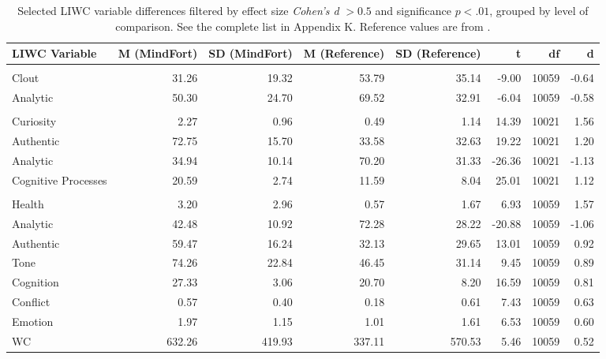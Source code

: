 \documentclass[sigconf]{acmart}
\begin{document}
\begin{table}[t]
\centering
\footnotesize
\caption{Selected LIWC variable differences filtered by effect size \textit{Cohen’s d} $> 0.5$ and significance $p < .01$, grouped by level of comparison. See the complete list in Appendix K. Reference values are from \cite{lmsys-chat-1m}.}
\label{tab:liwc_results_selected}
\begin{tabular}{lrrrrrrr}
\toprule
\textbf{LIWC Variable} & \textbf{M (MindFort)} & \textbf{SD (MindFort)} & \textbf{M (Reference)} & \textbf{SD (Reference)} & \textbf{t} & $\textbf{df}$ & \textbf{d} \\
\midrule
\addlinespace
\multicolumn{8}{l}{\textbf{Human messages only}} \\

Clout & 31.26 & 19.32 & 53.79 & 35.14 & -9.00 & 10059 & -0.64 \\
Analytic & 50.30 & 24.70 & 69.52 & 32.91 & -6.04 & 10059 & -0.58 \\

\addlinespace
\multicolumn{8}{l}{\textbf{Chatbot messages only}} \\

Curiosity & 2.27 & 0.96 & 0.49 & 1.14 & 14.39 & 10021 & 1.56 \\
Authentic & 72.75 & 15.70 & 33.58 & 32.63 & 19.22 & 10021 & 1.20 \\
Analytic & 34.94 & 10.14 & 70.20 & 31.33 & -26.36 & 10021 & -1.13 \\
Cognitive Processes & 20.59 & 2.74 & 11.59 & 8.04 & 25.01 & 10021 & 1.12 \\

\addlinespace
\multicolumn{8}{l}{\textbf{Complete conversations}} \\

Health & 3.20 & 2.96 & 0.57 & 1.67 & 6.93 & 10059 & 1.57 \\
Analytic & 42.48 & 10.92 & 72.28 & 28.22 & -20.88 & 10059 & -1.06 \\
Authentic & 59.47 & 16.24 & 32.13 & 29.65 & 13.01 & 10059 & 0.92 \\
Tone & 74.26 & 22.84 & 46.45 & 31.14 & 9.45 & 10059 & 0.89 \\
Cognition & 27.33 & 3.06 & 20.70 & 8.20 & 16.59 & 10059 & 0.81 \\
Conflict & 0.57 & 0.40 & 0.18 & 0.61 & 7.43 & 10059 & 0.63 \\
Emotion & 1.97 & 1.15 & 1.01 & 1.61 & 6.53 & 10059 & 0.60 \\
WC & 632.26 & 419.93 & 337.11 & 570.53 & 5.46 & 10059 & 0.52 \\
\bottomrule
\end{tabular}
\end{table}
\end{document}
